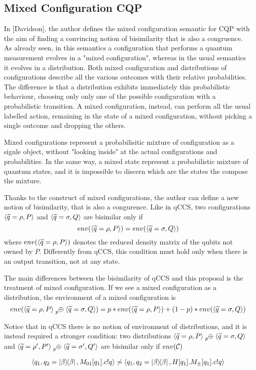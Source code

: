 \subsection{Mixed Configuration CQP}

In [Davidson], the author defines the mixed configuration semantic for CQP with the aim of finding a convincing notion of bisimilarity that is also a congruence. As already seen, in this semantics a configuration that performs a quantum  measurement evolves in a "mixed configuration", whereas in the usual semantics it evolves in a distribution. Both mixed configuration and distributions of configurations describe all the various outcomes with their relative probabilities. The difference is that a distribution exhibits immediately this probabilistic behaviour, choosing only  only one of the possible configuration with a probabilistic transition. A mixed configuration, instead, can perform all the usual labelled action, remaining in the state of a mixed configuration, without picking a single outcome and dropping the others.

Mixed configurations represent a probabilisitic mixture of configuration as a signle object, without "looking inside" at the actual configurations and probabilities. In the same way, a mixed state represent a probabilistic mixture of quantum states, and it is impossible to discern which are the states the compose the mixture.

Thanks to the construct of mixed configurations, the author can define a new notion of bisimilarity, that is also a congurence. Like in qCCS, two configurations $\langle\widetilde{q} = \rho, P\rangle$ and $\langle\widetilde{q} = \sigma, Q\rangle$ are bisimilar only if \[env(\langle\widetilde{q} = \rho, P\rangle) = env(\langle\widetilde{q} = \sigma, Q\rangle)\]
where $env(\langle\widetilde{q} = \rho, P\rangle)$ denotes the reduced density matrix of the qubits not owned by $P$. Differently from qCCS, this condition must hold only when there is an output transition, not at any state.

The main differences between the bisimilarity of qCCS and this proposal is the treatment of mixed configuration. If we see a mixed configuration as a distribution, the environment of a mixed configuration is 
\[env(\confw{\widetilde{q} = \rho, P} \psum{p} \confw{\widetilde{q} = \sigma, Q}) = p*env(\confw{\widetilde{q} = \rho, P}) + (1-p)*env(\confw{\widetilde{q} = \sigma, Q})\]

Notice that in qCCS there is no notion of environment of distributions, and it is instead required a stronger condition: two distributions $\confw{\widetilde{q} = \rho, P} \psum{p} \confw{\widetilde{q} = \sigma, Q}$ and $\confw{\widetilde{q} = \rho', P'} \psum{p} \confw{\widetilde{q} = \sigma', Q'}$ are bisimilar only if $env(\mathcal{C}{})$


\[ \langle q_1, q_2 = \ket{\beta}\!\!\bra{\beta}, M_{01}[q_1].c!q\rangle \not\sim \langle q_1, q_2 = \ket{\beta}\!\!\bra{\beta}, H[q_1].M_\pm[q_1].c!q\rangle \]
